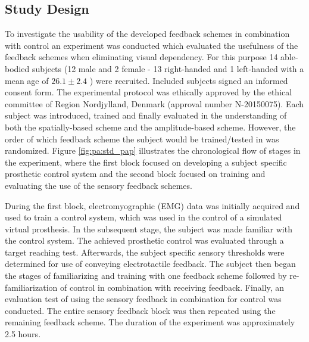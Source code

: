 \subsection{Study Design}

To investigate the usability of the developed feedback schemes in combination with control an experiment was conducted which evaluated the usefulness of the feedback schemes when eliminating visual dependency. For this purpose 14 able-bodied subjects (12 male and 2 female - 13 right-handed and 1 left-handed with a mean age of $26.1 \pm 2.4$ ) were recruited. Included subjects signed an informed consent form. The experimental protocol was ethically approved by the ethical committee of Region Nordjylland, Denmark (approval number N-20150075). Each subject was introduced, trained and finally evaluated in the understanding of both the spatially-based scheme and the amplitude-based scheme. However, the order of which feedback scheme the subject would be trained/tested in was randomized. Figure \ref{fig:pa:std_pap} illustrates the chronological flow of stages in the experiment, where the first block focused on developing a subject specific prosthetic control system and the second block focused on training and evaluating the use of the sensory feedback schemes. 

During the first block, electromyographic (EMG) data was initially acquired and used to train a control system, which was used in the control of a simulated virtual prosthesis. In the subsequent stage, the subject was made familiar with the control system. The achieved prosthetic control was evaluated through a target reaching test. Afterwards, the subject specific sensory thresholds were determined for use of conveying electrotactile feedback. The subject then began the stages of familiarizing and training with one feedback scheme followed by re-familiarization of control in combination with receiving feedback. Finally, an evaluation test of using the sensory feedback in combination for control was conducted. The entire sensory feedback block was then repeated using the remaining feedback scheme. The duration of the experiment was approximately 2.5 hours.  

